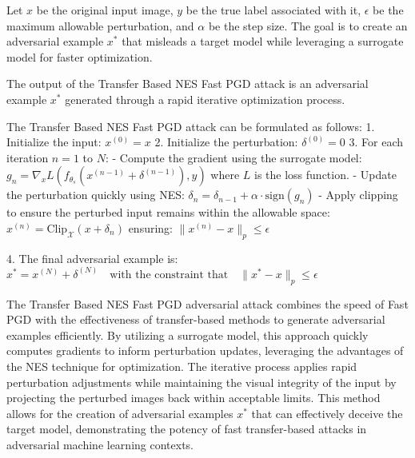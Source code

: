 Let $x$ be the original input image, $y$ be the true label associated with it, $\epsilon$ be the maximum allowable perturbation, and $\alpha$ be the step size. The goal is to create an adversarial example $x^*$ that misleads a target model while leveraging a surrogate model for faster optimization.

The output of the Transfer Based NES Fast PGD attack is an adversarial example $x^*$ generated through a rapid iterative optimization process.

The Transfer Based NES Fast PGD attack can be formulated as follows:
1. Initialize the input:
   $x^{(0)} = x$
2. Initialize the perturbation:
   $\delta^{(0)} = 0$
3. For each iteration $n = 1$ to $N$:
   - Compute the gradient using the surrogate model:
   $g_n = \nabla_x L(f_{\theta_s}(x^{(n-1)} + \delta^{(n-1)}), y)$
   where $L$ is the loss function.
   - Update the perturbation quickly using NES:
   $\delta_n = \delta_{n-1} + \alpha \cdot \text{sign}(g_n)$
   - Apply clipping to ensure the perturbed input remains within the allowable space:
   $x^{(n)} = \text{Clip}_{\mathcal{X}}(x + \delta_n)$
   ensuring:
   $\|x^{(n)} - x\|_p \leq \epsilon$

4. The final adversarial example is:
   $x^* = x^{(N)} + \delta^{(N)} \quad \text{with the constraint that} \quad \|x^* - x\|_p \leq \epsilon$

The Transfer Based NES Fast PGD adversarial attack combines the speed of Fast PGD with the effectiveness of transfer-based methods to generate adversarial examples efficiently. By utilizing a surrogate model, this approach quickly computes gradients to inform perturbation updates, leveraging the advantages of the NES technique for optimization. The iterative process applies rapid perturbation adjustments while maintaining the visual integrity of the input by projecting the perturbed images back within acceptable limits. This method allows for the creation of adversarial examples $x^*$ that can effectively deceive the target model, demonstrating the potency of fast transfer-based attacks in adversarial machine learning contexts.
